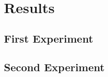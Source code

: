 \documentclass[../main.tex]{subfiles}
\begin{document}
\chapter{Results}
\section{First Experiment}
\section{Second Experiment}
\end{document}
